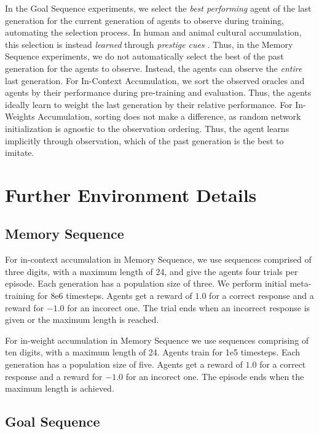 \documentclass{article}
\begin{document}
In the Goal Sequence experiments, we select the \textit{best performing} agent of the last generation for the current generation of agents to observe during training, automating the selection process. In human and animal cultural accumulation, this selection is instead \textit{learned} through \textit{prestige cues} \cite{barkow1975prestige, horner2010prestige}. Thus, in the Memory Sequence experiments, we do not automatically select the best of the past generation for the agents to observe. Instead, the agents can observe the \textit{entire} last generation. For In-Context Accumulation, we sort the observed oracles and agents by their performance during pre-training and evaluation. Thus, the agents ideally learn to weight the last generation by their relative performance. For In-Weights Accumulation, sorting does not make a difference, as random network initialization is agnostic to the observation ordering. Thus, the agent learns implicitly through observation, which of the past generation is the best to imitate.


\newpage
\section{Further Environment Details}
\label{A:details}

\subsection{Memory Sequence}

For in-context accumulation in Memory Sequence, we use sequences comprised of three digits, with a maximum length of 24, and give the agents four trials per episode. Each generation has a population size of three. We perform initial meta-training for 8e6 timesteps. Agents get a reward of $1.0$ for a correct response and a reward for $-1.0$ for an incorect one. The trial ends when an incorrect response is given or the maximum length is reached.

For in-weight accumulation in Memory Sequence we use sequences comprising of ten digits, with a maximum length of 24. Agents train for 1e5 timesteps. Each generation has a population size of five. Agents get a reward of $1.0$ for a correct response and a reward for $-1.0$ for an incorect one. The episode ends when the maximum length is achieved.

\subsection{Goal Sequence}
\end{document}
